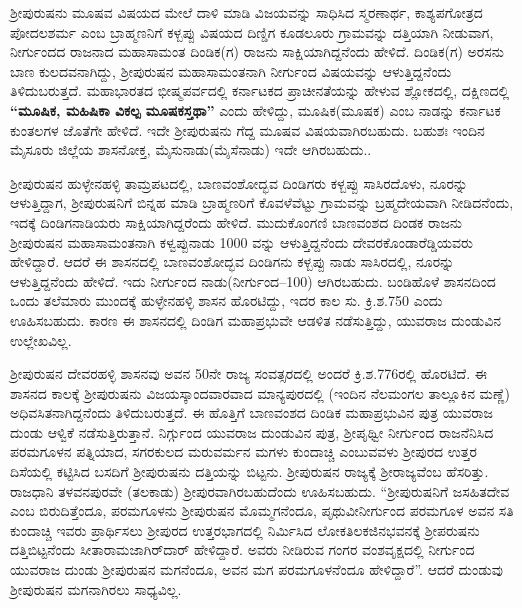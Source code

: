 ಶ‍್ರೀಪುರುಷನು ಮೂಷವ ವಿಷಯದ ಮೇಲೆ ದಾಳಿ ಮಾಡಿ ವಿಜಯವನ್ನು ಸಾಧಿಸಿದ ಸ್ಮರಣಾರ್ಥ, ಕಾಶ್ಯಪಗೋತ್ರದ ಪೋದಲಶರ್ಮ ಎಂಬ ಬ್ರಾಹ್ಮಣನಿಗೆ ಕಳ್ಬಪ್ಪು ವಿಷಯದ ದಿಣ್ಡಿಗ ಕೂಡಲೂರು ಗ್ರಾಮವನ್ನು ದತ್ತಿಯಾಗಿ ನೀಡುವಾಗ, ನೀರ್ಗುಂದದ ರಾಜನಾದ ಮಹಾಸಾಮಂತ ದಿಂಡಿಕ(ಗ) ರಾಜನು ಸಾಕ್ಷಿಯಾಗಿದ್ದನೆಂದು ಹೇಳಿದೆ. ದಿಂಡಿಕ(ಗ) ಅರಸನು ಬಾಣ ಕುಲದವ\-ನಾಗಿದ್ದು, ಶ‍್ರೀಪುರುಷನ ಮಹಾಸಾಮಂತನಾಗಿ ನೀರ್ಗುಂದ ವಿಷಯವನ್ನು ಆಳುತ್ತಿದ್ದನೆಂದು ತಿಳಿದುಬರುತ್ತದೆ. ಮಹಾಭಾರತದ ಭೀಷ್ಮಪರ್ವದಲ್ಲಿ ಕರ್ನಾಟಕದ ಪ್ರಾಚೀನತೆಯನ್ನು ಹೇಳುವ ಶ್ಲೋಕದಲ್ಲಿ, ದಕ್ಷಿಣದಲ್ಲಿ\textbf{ “ಮೂಷಿಕ, ಮಹಿಷಿಕಾ ವಿಕಲ್ಪ ಮೂಷಕಸ್ತಥಾ” }ಎಂದು ಹೇಳಿದ್ದು, ಮೂಷಿಕ(ಮೂಷಕ) ಎಂಬ ನಾಡನ್ನು ಕರ್ನಾಟಕ ಕುಂತಲಗಳ ಜೊತೆಗೇ ಹೇಳಿದೆ. ಇದೇ ಶ‍್ರೀಪುರುಷನು ಗೆದ್ದ ಮೂಷವ ವಿಷಯವಾಗಿರಬಹುದು. ಬಹುಶಃ ಇಂದಿನ ಮೈಸೂರು ಜಿಲ್ಲೆಯ ಶಾಸನೋಕ್ತ, ಮೈಸುನಾಡು(ಮೈಸೆನಾಡು) ಇದೇ ಆಗಿರಬಹುದು..

ಶ‍್ರೀಪುರುಷನ ಹುಳ್ಳೇನಹಳ್ಳಿ ತಾಮ್ರಪಟದಲ್ಲಿ, ಬಾಣವಂಶೋದ್ಭವ ದಿಂಡಿಗರು ಕಳ್ಬಪ್ಪು ಸಾಸಿರದೊಳು, ನೂರನ್ನು ಆಳುತ್ತಿದ್ದಾಗ, ಶ‍್ರೀಪುರುಷನಿಗೆ ಬಿನ್ನಹ ಮಾಡಿ ಬ್ರಾಹ್ಮಣರಿಗೆ ಕೊವಳೆವೆಟ್ಟು ಗ್ರಾಮವನ್ನು ಬ್ರಹ್ಮದೇಯವಾಗಿ ನೀಡಿದನೆಂದು, ಇದಕ್ಕೆ ದಿಂಡಿಗನಾಡಿಯರು ಸಾಕ್ಷಿಯಾಗಿದ್ದರೆಂದು ಹೇಳಿದೆ. ಮುದುಕೊಂಗಣಿ ಬಾಣವಂಶದ ದಿಂಡಕ ರಾಜನು ಶ‍್ರೀಪುರುಷನ ಮಹಾಸಾಮಂತನಾಗಿ ಕಳ್ವಪ್ಪುನಾಡು 1000 ವನ್ನು ಆಳುತ್ತಿದ್ದನೆಂದು ದೇವರಕೊಂಡಾರೆಡ್ಡಿಯವರು ಹೇಳಿದ್ದಾರೆ. ಆದರೆ ಈ ಶಾಸನದಲ್ಲಿ ಬಾಣವಂಶೋದ್ಭವ ದಿಂಡಿಗನು ಕಳ್ಬಪ್ಪು ನಾಡು ಸಾಸಿರದಲ್ಲಿ, ನೂರನ್ನು ಆಳುತ್ತಿದ್ದನೆಂದು ಹೇಳಿದೆ. ಇದು ನೀರ್ಗುಂದ ನಾಡು(ನೀರ್ಗುಂದ–100) ಆಗಿರಬಹುದು. ಬಂಡಿಹೊಳೆ ಶಾಸನದಿಂದ ಒಂದು ತಲೆಮಾರು ಮುಂದಕ್ಕೆ ಹುಳ್ಳೇನಹಳ್ಳಿ ಶಾಸನ ಹೊರಟಿದ್ದು, ಇದರ ಕಾಲ ಸು. ಕ್ರಿ.ಶ.750 ಎಂದು ಊಹಿಸಬಹುದು. ಕಾರಣ ಈ ಶಾಸನದಲ್ಲಿ ದಿಂಡಿಗ ಮಹಾಪ್ರಭುವೇ ಆಡಳಿತ ನಡೆಸುತ್ತಿದ್ದು, ಯುವರಾಜ ದುಂಡುವಿನ ಉಲ್ಲೇಖವಿಲ್ಲ.

ಶ‍್ರೀಪುರುಷನ ದೇವರಹಳ್ಳಿ ಶಾಸನವು ಅವನ 50ನೇ ರಾಜ್ಯ ಸಂವತ್ಸರದಲ್ಲಿ ಅಂದರೆ ಕ್ರಿ.ಶ.776ರಲ್ಲಿ ಹೊರಟಿದೆ. ಈ ಶಾಸನದ ಕಾಲಕ್ಕೆ ಶ‍್ರೀಪುರುಷನು ವಿಜಯಸ್ಕಾಂದವಾರವಾದ ಮಾನ್ಯಪುರದಲ್ಲಿ (ಇಂದಿನ ನೆಲಮಂಗಲ ತಾಲ್ಲೂಕಿನ ಮಣ್ಣೆ) ಅಧಿವಸಿತನಾಗಿದ್ದನೆಂದು ತಿಳಿದುಬರುತ್ತದೆ. ಈ ಹೊತ್ತಿಗೆ ಬಾಣವಂಶದ ದಿಂಡಿಕ ಮಹಾಪ್ರಭುವಿನ ಪುತ್ರ ಯುವರಾಜ ದುಂಡು ಆಳ್ವಿಕೆ ನಡೆಸುತ್ತಿರುತ್ತಾನೆ. ನಿರ್ಗ್ಗುಂದ ಯುವರಾಜ ದುಂಡುವಿನ ಪುತ್ರ, ಶ‍್ರೀಪೃಥ್ವೀ ನೀರ್ಗುಂದ ರಾಜನೆನಿಸಿದ ಪರಮಗೂಳನ ಪತ್ನಿಯಾದ, ಸಗರಕುಲದ ಮರುವರ್ಮನ ಮಗಳು ಕುಂದಾಚ್ಚಿ ಎಂಬುವವಳು ಶ‍್ರೀಪುರದ ಉತ್ತರ ದಿಸೆಯಲ್ಲಿ ಕಟ್ಟಿಸಿದ ಬಸದಿಗೆ ಶ‍್ರೀಪುರುಷನು ದತ್ತಿಯನ್ನು ಬಿಟ್ಟನು. ಶ‍್ರೀಪುರುಷನ ರಾಜ್ಯಕ್ಕೆ ಶ‍್ರೀರಾಜ್ಯವೆಂಬ ಹೆಸರಿತ್ತು. ರಾಜಧಾನಿ ತಳವನಪುರವೇ (ತಲಕಾಡು) ಶ‍್ರೀಪುರವಾಗಿರಬಹುದೆಂದು ಊಹಿಸಬಹುದು. “ಶ‍್ರೀಪುರುಷನಿಗೆ ಜಸಹಿತದೇವ ಎಂಬ ಬಿರುದಿತ್ತೆಂದೂ, ಪರಮಗೂಳನು ಶ‍್ರೀಪುರುಷನ ಮೊಮ್ಮಗನೆಂದೂ, ಪೃಥುವೀನೀರ್ಗುಂದ ಪರಮಗೂಳ ಅವನ ಸತಿ ಕುಂದಾಚ್ಚಿ ಇವರು ಪ್ರಾರ್ಥಿಸಲು ಶ‍್ರೀಪುರದ ಉತ್ತರಭಾಗದಲ್ಲಿ ನಿರ್ಮಿಸಿದ ಲೋಕತಿಲಕಜಿನಭವನಕ್ಕೆ ಶ‍್ರೀಪರುಷನು ದತ್ತಿಬಿಟ್ಟನೆಂದು ಸೀತಾರಾಮ\-ಜಾಗಿರ್​ದಾರ್​ ಹೇಳಿದ್ದಾರೆ. ಅವರು ನೀಡಿರುವ ಗಂಗರ ವಂಶವೃಕ್ಷದಲ್ಲಿ ನೀರ್ಗುಂದ ಯುವರಾಜ ದುಂಡು ಶ‍್ರೀಪುರುಷನ ಮಗನೆಂದೂ, ಅವನ ಮಗ ಪರಮಗೂಳನೆಂದೂ ಹೇಳಿದ್ದಾರೆ”. ಆದರೆ ದುಂಡುವು ಶ‍್ರೀಪುರುಷನ ಮಗನಾಗಿರಲು ಸಾಧ್ಯವಿಲ್ಲ.

